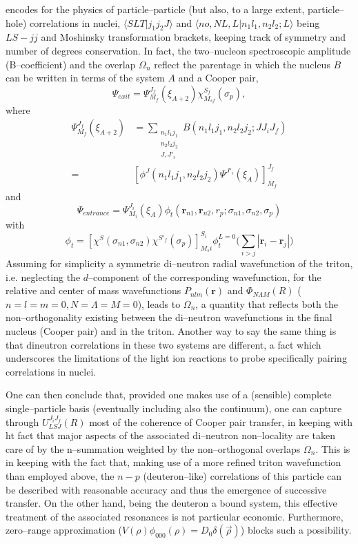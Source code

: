 \documentclass[a4paper,11pt]{book}
\numberwithin{equation}{section}
\numberwithin{figure}{section}
\numberwithin{table}{section}
\begin{document}
encodes for the physics of particle--particle (but also, to a large extent, particle--hole) correlations in nuclei, $\langle SLT|j_1j_2J\rangle$ and $\langle no,NL,L|n_1 l_1,n_2l_2;L\rangle$ being $LS-jj$ and Moshinsky transformation brackets, keeping track of symmetry and number of degrees conservation. In fact, the two--nucleon spectroscopic amplitude (B--coefficient) and the overlap $\Omega_n$ reflect the parentage in which the nucleus $B$ can be written in terms of the system $A$ and a Cooper pair,
\begin{equation*}
\Psi_{exit}=\Psi_{M_f}^{J_f}(\xi_{A+2})\chi^{S_f}_{M_{sf}}(\sigma_p),
\end{equation*}
where
\begin{equation*}
\begin{split}
\Psi_{M_f}^{J_f}(\xi_{A+2})&=\sum_{\substack{n_1l_1j_1\\n_2l_2j_2\\J,J'_i}}B(n_1l_1j_1,n_2l_2j_2;JJ_iJ_f)\\
=&\left[\phi^J(n_1l_1j_1,n_2l_2j_2)\Psi^{J'_i}(\xi_A)\right]_{M_f}^{J_f}
\end{split}
\end{equation*}
and
\begin{equation*}
\Psi_{entrance}=\Psi_{M_i}^{J_i}(\xi_A)\phi_t(\mathbf r_{n1},\mathbf r_{n2},r_p;\sigma_{n1},\sigma_{n2},\sigma_p)
\end{equation*}
with
\begin{equation*}
\phi_t=\left[\chi^S(\sigma_{n1},\sigma_{n2})\chi^{S'_f}(\sigma_p)
\right]_{M_si}^{S_i}\phi_t^{L=0}\Big(\sum_{i>j}|\mathbf r_i-\mathbf r_j|\Big)
\end{equation*}
Assuming for simplicity a symmetric di--neutron radial wavefunction of the triton, i.e. neglecting the $d$--component of the corresponding wavefunction, for the relative and center of mass wavefunctions $P_{nlm}(\mathbf{r})$ and $\Phi_{N\Lambda M}(R)$ ($n=l=m=0, N=\Lambda=M=0$), leads to $\Omega_n$, a quantity that reflects both the non--orthogonality existing between the di--neutron wavefunctions in the final nucleus (Cooper pair) and in the triton. Another way to say the same thing is that dineutron correlations in these two systems are different, a fact which underscores the limitations of the light ion reactions to probe specifically pairing correlations in nuclei.


One can then conclude that, provided one makes use of a (sensible) complete single--particle basis (eventually including also the continuum), one can capture through $U_{LSJ}^{J_iJ_f}(R)$ most of the coherence of Cooper pair transfer, in keeping with ht fact that major aspects of the associated di--neutron non--locality are taken care of by the n--summation weighted by the non--orthogonal overlaps $\Omega_n$. This is in keeping with the fact that, making use of a more refined triton wavefunction than employed above, the $n-p$ (deuteron--like) correlations of this particle can be described with reasonable accuracy and thus the emergence of successive transfer. On the other hand, being the deuteron a bound system, this effective treatment of the associated resonances is not particular economic. Furthermore, zero--range approximation ($V(\rho)\phi_{000}(\rho)=D_0\delta(\vec \rho)$) blocks such a possibility.
\end{document}
